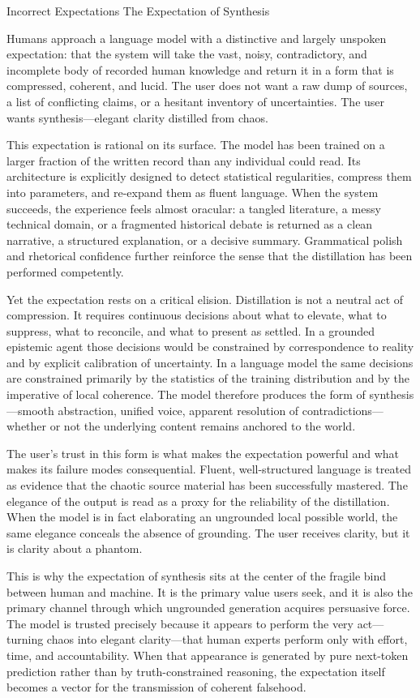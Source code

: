 Incorrect Expectations
The Expectation of Synthesis

Humans approach a language model with a distinctive and largely unspoken expectation: that the system will take the vast, noisy, contradictory, and incomplete body of recorded human knowledge and return it in a form that is compressed, coherent, and lucid. The user does not want a raw dump of sources, a list of conflicting claims, or a hesitant inventory of uncertainties. The user wants synthesis—elegant clarity distilled from chaos.

This expectation is rational on its surface. The model has been trained on a larger fraction of the written record than any individual could read. Its architecture is explicitly designed to detect statistical regularities, compress them into parameters, and re-expand them as fluent language. When the system succeeds, the experience feels almost oracular: a tangled literature, a messy technical domain, or a fragmented historical debate is returned as a clean narrative, a structured explanation, or a decisive summary. Grammatical polish and rhetorical confidence further reinforce the sense that the distillation has been performed competently.

Yet the expectation rests on a critical elision. Distillation is not a neutral act of compression. It requires continuous decisions about what to elevate, what to suppress, what to reconcile, and what to present as settled. In a grounded epistemic agent those decisions would be constrained by correspondence to reality and by explicit calibration of uncertainty. In a language model the same decisions are constrained primarily by the statistics of the training distribution and by the imperative of local coherence. The model therefore produces the form of synthesis—smooth abstraction, unified voice, apparent resolution of contradictions—whether or not the underlying content remains anchored to the world.

The user’s trust in this form is what makes the expectation powerful and what makes its failure modes consequential. Fluent, well-structured language is treated as evidence that the chaotic source material has been successfully mastered. The elegance of the output is read as a proxy for the reliability of the distillation. When the model is in fact elaborating an ungrounded local possible world, the same elegance conceals the absence of grounding. The user receives clarity, but it is clarity about a phantom.

This is why the expectation of synthesis sits at the center of the fragile bind between human and machine. It is the primary value users seek, and it is also the primary channel through which ungrounded generation acquires persuasive force. The model is trusted precisely because it appears to perform the very act—turning chaos into elegant clarity—that human experts perform only with effort, time, and accountability. When that appearance is generated by pure next-token prediction rather than by truth-constrained reasoning, the expectation itself becomes a vector for the transmission of coherent falsehood.

